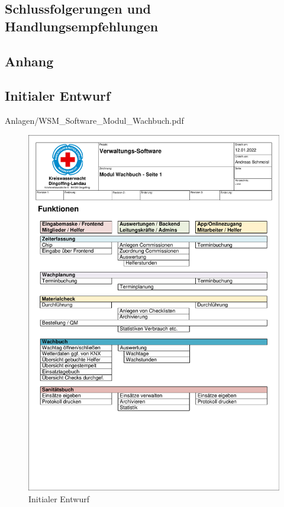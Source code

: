 \documentclass[fontsize=12pt,openright,oneside,paper=a4,BCOR=1cm]{scrbook}
\begin{document}
\section{Schlussfolgerungen und Handlungsempfehlungen}

%
%

\renewcommand{\cleardoublepage}{}

\begin{appendix}
\chapter{Anhang}
\section{Initialer Entwurf}


    {Anlagen/WSM_Software_Modul_Wachbuch.pdf}
\begin{figure}[H]
\centering
    \includegraphics[page=3,scale=0.75]{Anlagen/WSM_Software_Modul_Wachbuch.pdf}
  \caption{Initialer Entwurf}
  \label{fig:initial}
\end{figure}


\end{appendix}
\end{document}
